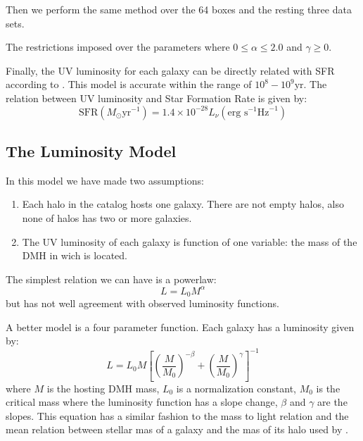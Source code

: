 \documentclass{emulateapj}
\begin{document}
Then we perform the same method over the 64 boxes and the resting three data sets.

The restrictions imposed over the parameters where $0 \leq \alpha \leq 2.0 $  and 
$\gamma \geq 0$.


Finally, the UV luminosity for each galaxy can be directly related with SFR according 
to \citet{madau98}.
This model is accurate within the range of $10^8 - 10^9 \textrm{yr}$\citep{kennicutt98}.
The relation between UV luminosity and Star Formation Rate \citep{madau98,kennicutt98} 
is given by:
\begin{equation}
 \textrm{SFR}\left(M_\odot \textrm{yr}^{-1}\right) 
      = 1.4 \times 10^{-28} L_{\nu} \left( \textrm{erg s}^{-1}\textrm{Hz}^{-1} 
	\right)
\end{equation}

\subsection{The Luminosity Model}

In this model we have made two assumptions:
\begin{enumerate}
 \item Each halo in the catalog hosts one galaxy. There are not empty
halos, also none of halos has two or more galaxies.
 \item The UV luminosity of each galaxy is function of one variable: the mass of
the DMH in wich is located.
\end{enumerate}

The simplest relation we can have is a powerlaw:
 \begin{equation}
  L = L_0 M^\alpha
 \end{equation}
but has not well agreement with observed luminosity functions.

A better model is a four parameter function. Each galaxy has a luminosity given
by:
  \begin{equation}
  L = L_{0} M \left[ \left( \frac{M}{M_0}\right)^{-\beta} 
		   + \left( \frac{M}{M_0}\right)^{\gamma} 
               \right]^{-1}
  \end{equation}
where $M$ is the hosting DMH mass, $L_{0}$ is a normalization constant, $M_0$
is the critical mass where the luminosity function has a slope change, 
$\beta$ and $\gamma$ are the slopes. This equation has a similar fashion to the
mass to light relation \citep{vandenbosch03} and the mean relation between
stellar mas of a galaxy and the mas of its halo used by \cite{moster10}.
\end{document}
